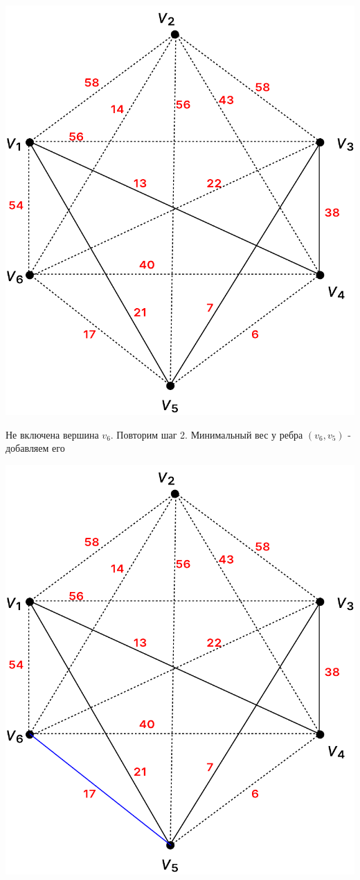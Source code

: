\documentclass[12pt]{article}
\begin{document}
\begin{center}
\includegraphics[scale=.6]{19_4.pdf}
\end{center}

Не включена вершина $v_6$. Повторим шаг 2. Минимальный вес у ребра $(v_6, v_5)$
- добавляем его

\begin{center}
\includegraphics[scale=.6]{19_5.pdf}
\end{center}
\end{document}
